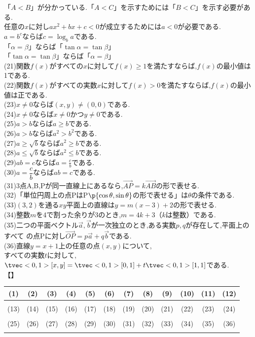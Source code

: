 \documentclass[10pt,fleqn,a4paper]{jsarticle}
\newcommand{\theme}[1]{【\text{#1}】}
\begin{document}
\kakkojyuroku 「$A<B$」が分かっている.「$A<C$」を示すためには「$B<C$」を示す必要がある.\\
\kakkojyushichi 任意の$x$に対し$ax^2+bx+c<0$が成立するためには$a<0$が必要である.\\
\kakkojyuhachi $a=b^c$ならば$c=\log_b a$である.\\
\kakkojyukyu 「$\alpha=\beta$」ならば「$\tan\alpha=\tan\beta$」\\
\kakkonijyu 「$\tan\alpha=\tan\beta$」ならば「$\alpha=\beta$」\\
(21)関数$f(x)$がすべての$x$に対して$f(x)\geq1$を満たすならば,$f(x)$の最小値は1である.\\
(22)関数$f(x)$がすべての実数$x$に対して$f(x)>0$を満たすならば,$f(x)$の最小値は正である.\\
(23)$x\neq0$ならば$(x,y)\neq(0,0)$である.\\
(24)$x\neq0$ならば$x\neq0$かつ$y\neq0$である.\\
(25)$a>b$ならば$a\geq b$である.\\
(26)$a>b$ならば$a^2>b^2$である.\\
(27)$a\geq\sqrt{b}$ならば$a^2\geq b$である.\\
(28)$a\leq\sqrt{b}$ならば$a^2\leq b$である.\\
(29)$ab=c$ならば$a=\frac{c}{b}$である.\\
(30)$a=\dfrac{c}{b}$ならば$ab=c$である.\\
(31)3点A,B,Pが同一直線上にあるなら,$\Vec{AP}=k\Vec{AB}$の形で表せる.\\
(32)「単位円周上の点PはP$\p{\cos\theta,\sin\theta}$の形で表せる」は$\theta$の条件である.\\
(33)$(3,2)$を通る$xy$平面上の直線は$y=m(x-3)+2$の形で表せる.\\
(34)整数$m$を4で割った余りが3のとき,$m=4k+3（kは整数）$である.\\
(35)二つの平面ベクトル$\vec{a},\vec{b}$が一次独立のとき,ある実数$p,q$が存在して,平面上のすべて
の点Pに対し$\Vec{OP}=p\vec{a}+q\vec{b}$である.\\
(36)直線$y=x+1$上の任意の点$(x,y)$について,\\すべての実数$t$に対して,$\tvec<0,1>[x,y]=\tvec<0,1>[0,1]+t\tvec<0,1>[1,1]$である.\\
\theme{解答欄}
\begin{center}
    \begin{tabular}{|c|c|c|c|c|c|c|c|c|c|c|c|}
        \hline
        (1)&(2)&(3)&(4)&(5)&(6)&(7)&(8)&(9)&(10)&(11)&(12)\\
        \hline
        {}&{}&{}&{}&{}&{}&{}&{}&{}&{}&{}&{}\\
        \hline
        \hline
        (13)&(14)&(15)&(16)&(17)&(18)&(19)&(20)&(21)&(22)&(23)&(24)\\
        \hline
        {}&{}&{}&{}&{}&{}&{}&{}&{}&{}&{}&{}\\
        \hline
        \hline
        (25)&(26)&(27)&(28)&(29)&(30)&(31)&(32)&(33)&(34)&(35)&(36)\\
        \hline
        {}&{}&{}&{}&{}&{}&{}&{}&{}&{}&{}&{}\\
        \hline
    \end{tabular}
\end{center}
\newpage
\end{document}
